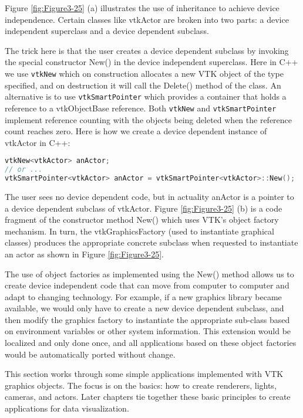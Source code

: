 Figure \ref{fig:Figure3-25} (a) illustrates the use of inheritance to achieve device independence. Certain classes like vtkActor are broken into two parts: a device independent superclass and a device dependent subclass.

\begin{samepage}
The trick here is that the user creates a device dependent
subclass by invoking the special constructor New() in the device independent superclass. Here in C++ we use \texttt{vtkNew} which on construction allocates a new VTK object of the type specified, and on destruction it will call the Delete() method of the class. An alternative is to use \texttt{vtkSmartPointer} which provides a container that holds a reference to a vtkObjectBase reference. Both \texttt{vtkNew} and \texttt{vtkSmartPointer} implement reference counting with the objects being deleted when the reference count reaches zero. Here is how we create a device dependent instance of vtkActor in C++:
\begin{lstlisting}[language=C++]
vtkNew<vtkActor> anActor;
// or ...
vtkSmartPointer<vtkActor> anActor = vtkSmartPointer<vtkActor>::New();
\end{lstlisting}
\noindent The user sees no device dependent code, but in actuality anActor is a pointer to a device dependent subclass of vtkActor. Figure \ref{fig:Figure3-25} (b) is a code fragment of the constructor method New() which uses VTK's object factory mechanism. In turn, the vtkGraphicsFactory (used to instantiate graphical classes) produces the appropriate concrete subclass when requested to instantiate an actor as shown in Figure \ref{fig:Figure3-25}.
\end{samepage}

The use of object factories as implemented using the New() method allows us to create device independent code that can move from computer to computer and adapt to changing technology. For example, if a new graphics library became available, we would only have to create a new device dependent subclass, and then modify the graphics factory to instantiate the appropriate sub-class based on environment variables or other system information. This extension would be localized and only done once, and all applications based on these object factories would be automatically ported without change.

This section works through some simple applications implemented with VTK graphics objects. The focus is on the basics: how to create renderers, lights, cameras, and actors. Later chapters tie together these basic principles to create applications for data visualization.

